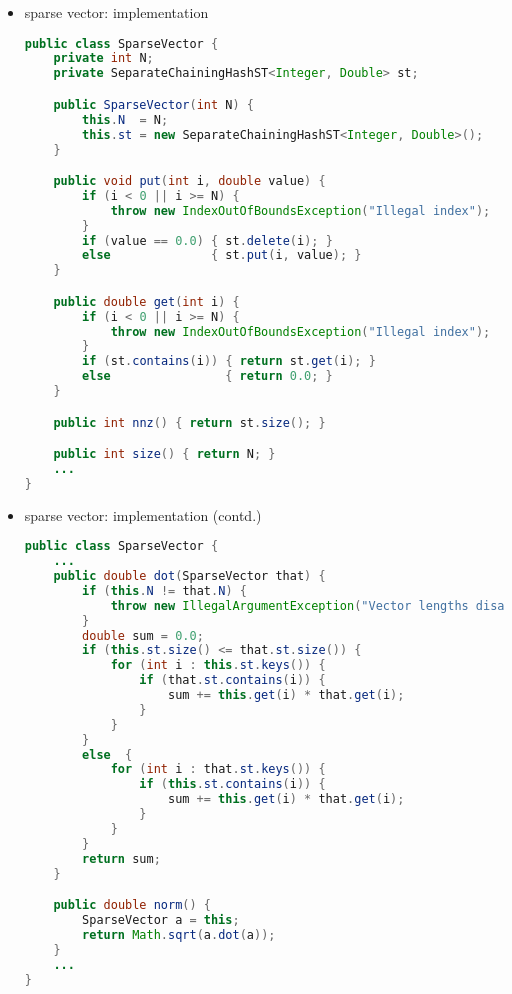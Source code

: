 \documentclass[8pt,a4paper,compress]{beamer}
\begin{document}
\begin{frame}[fragile]
\begin{itemize}
\item sparse vector: implementation
\begin{lstlisting}[language=Java]
public class SparseVector {
    private int N; 
    private SeparateChainingHashST<Integer, Double> st; 

    public SparseVector(int N) {
        this.N  = N;
        this.st = new SeparateChainingHashST<Integer, Double>();
    }

    public void put(int i, double value) {
        if (i < 0 || i >= N) {
            throw new IndexOutOfBoundsException("Illegal index");
        }
        if (value == 0.0) { st.delete(i); }
        else              { st.put(i, value); }
    }

    public double get(int i) {
        if (i < 0 || i >= N) { 
            throw new IndexOutOfBoundsException("Illegal index");
        }
        if (st.contains(i)) { return st.get(i); }
        else                { return 0.0; }
    }

    public int nnz() { return st.size(); }

    public int size() { return N; }
    ...
}
\end{lstlisting}
\end{itemize}
\end{frame}

\begin{frame}[fragile]
\begin{itemize}
\item sparse vector: implementation (contd.)
\begin{lstlisting}[language=Java]
public class SparseVector {
    ...
    public double dot(SparseVector that) {
        if (this.N != that.N) {
            throw new IllegalArgumentException("Vector lengths disagree");
        }
        double sum = 0.0;
        if (this.st.size() <= that.st.size()) {
            for (int i : this.st.keys()) {
                if (that.st.contains(i)) { 
                    sum += this.get(i) * that.get(i); 
                }
            }
        }
        else  {
            for (int i : that.st.keys()) {
                if (this.st.contains(i)) {
                    sum += this.get(i) * that.get(i);
                }
            }
        }
        return sum;
    }

    public double norm() {
        SparseVector a = this;
        return Math.sqrt(a.dot(a));
    }
    ...
}
\end{lstlisting}
\end{itemize}
\end{frame}
\end{document}
